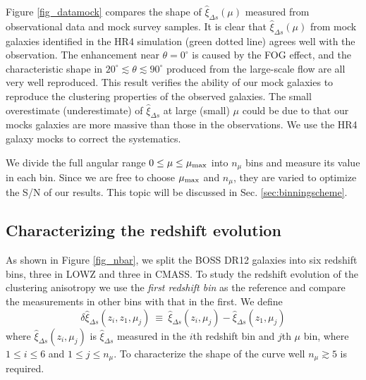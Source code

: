 \documentclass[iop]{emulateapj}
\begin{document}
Figure \ref{fig_datamock}  compares the shape of $\hat\xi_{\Delta s}(\mu)$ measured from observational data and mock survey samples.
It is clear that $\hat \xi_{\Delta s}(\mu)$ from mock galaxies identified in the HR4 simulation (green dotted line) agrees well with the observation.
The enhancement near $\theta=0^\circ$ is caused by the FOG effect,
and the characteristic shape in $20^\circ\lesssim\theta\lesssim90^\circ$ 
produced from the large-scale flow
are all very well reproduced.
This result verifies the ability of our mock galaxies to reproduce the clustering properties of the observed galaxies.
The small overestimate (underestimate) of $\hat\xi_{\Delta s}$ at large (small) $\mu$ could be due to 
that our mocks galaxies are more massive than those in the observations.
We use the HR4 galaxy mocks to correct the systematics.


We divide the full angular range $0\leq\mu\leq\mu_{\rm max}$ into $n_{\mu}$ bins and measure its value in each bin.
Since we are free to choose $\mu_{\rm max}$ and $n_{\mu}$,
they are varied to optimize the S/N of our results.
This topic will be discussed in Sec. \ref{sec:binningscheme}.

\subsection{Characterizing the redshift evolution}


As shown in Figure \ref{fig_nbar}, we split the BOSS DR12 galaxies into six redshift bins, three in LOWZ and three in CMASS.
To study the redshift evolution of the clustering anisotropy 
we use the {\it first redshift bin} as the reference and compare the measurements in other bins with that in the first.
We define
\begin{equation} \label{eq:deltahatxi}
\delta \hat\xi_{\Delta s}(z_i,z_1,\mu_j)\ \equiv\ \hat\xi_{\Delta s}(z_i,\mu_j) - \hat\xi_{\Delta s}(z_1,\mu_j)
\end{equation}
where $\hat\xi_{\Delta s}(z_i,\mu_j)$ is $\hat\xi_{\Delta s}$ measured in the $i$th redshift bin and $j$th $\mu$ bin,
where $1\leq i \leq 6$ and $1\leq j \leq n_{\mu}$.
To characterize the shape of the curve well $n_\mu \gtrsim5$ is required.
\end{document}

